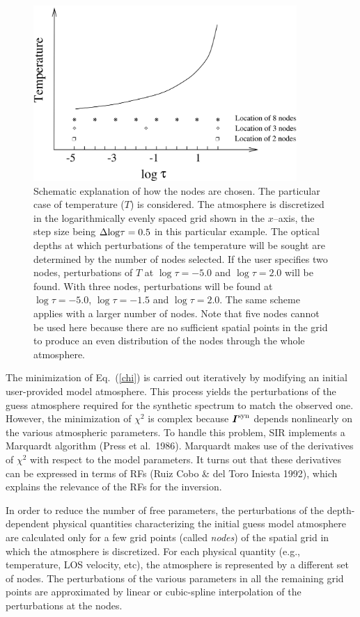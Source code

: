 \documentclass[11pt]{report}
\def\vec#1{\mbox{\boldmath $ #1$}}
\begin{document}
\begin{figure}[tb]
		\centering
		\includegraphics[width=10cm]{nodos.png}
		\caption{Schematic explanation of how the nodes are chosen. The
particular case of temperature ($T$) is considered. The atmosphere is
discretized in the logarithmically evenly spaced grid shown in the
$x$--axis, the step size being $\Delta {\rm log} \tau = 0.5$ in this
particular example. The optical depths at which perturbations of the
temperature will be sought are determined by the number of nodes
selected.  If the user specifies two nodes, perturbations of $T$ at
$\log \tau = -5.0$ and $\log \tau = 2.0$ will be found. With three
nodes, perturbations will be found at $\log \tau = -5.0$, $\log \tau =
-1.5$ and $\log \tau = 2.0$. The same scheme applies with a larger
number of nodes.  Note that five nodes cannot be used here because
there are no sufficient spatial points in the grid to produce an even
distribution of the nodes through the whole atmosphere.}
 \label{nodosfig}

\end{figure}


The minimization of Eq.\ (\ref{chi}) is carried out iteratively by
modifying an initial user-provided model atmosphere. This process
yields the perturbations of the guess atmosphere required for the
synthetic spectrum to match the observed one. However, the minimization
of $\chi^2$ is complex because $\vec{I}^{\rm syn}$ depends nonlinearly
on the various atmospheric parameters. To handle this problem, SIR
implements a Marquardt algorithm (Press et al.\ 1986).  Marquardt makes
use of the derivatives of $\chi^2$ with respect to the model
parameters. It turns out that these derivatives can be expressed in
terms of RFs (Ruiz Cobo \& del Toro Iniesta 1992), which explains the
relevance of the RFs for the inversion.

In order to reduce the number of free parameters, the perturbations of
the depth-dependent physical quantities characterizing the initial guess 
model atmosphere are calculated only for a few grid points (called {\em nodes}) of the
spatial grid in which the atmosphere is discretized. For each physical
quantity (e.g., temperature, LOS velocity, etc), the atmosphere is
represented by a different set of nodes. The perturbations of the
various parameters in all the remaining grid points are approximated 
by linear or cubic-spline interpolation of the perturbations at the nodes.  
\end{document}
